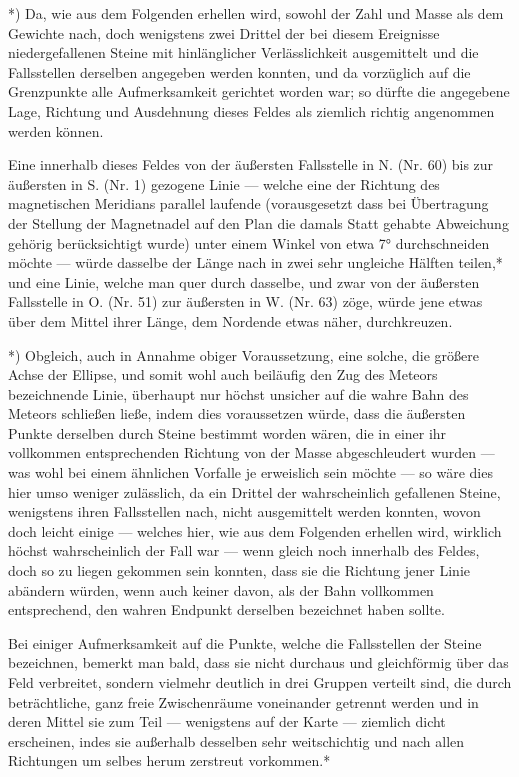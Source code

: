 \documentclass[a4paper, 11pt, oneside, german]{article}
\begin{document}
*) Da, wie aus dem Folgenden erhellen wird, sowohl der Zahl und Masse als dem Gewichte nach, doch wenigstens zwei Drittel der bei diesem Ereignisse niedergefallenen Steine mit hinlänglicher Verlässlichkeit ausgemittelt und die Fallsstellen derselben angegeben werden konnten, und da vorzüglich auf die Grenzpunkte alle Aufmerksamkeit gerichtet worden war; so dürfte die angegebene Lage, Richtung und Ausdehnung dieses Feldes als ziemlich richtig angenommen werden können.

Eine innerhalb dieses Feldes von der äußersten Fallsstelle in N. (Nr. 60) bis zur äußersten in S. (Nr. 1) gezogene Linie --- welche eine der Richtung des magnetischen Meridians parallel laufende (vorausgesetzt dass bei Übertragung der Stellung der Magnetnadel auf den Plan die damals Statt gehabte Abweichung gehörig berücksichtigt wurde) unter einem Winkel von etwa 7° durchschneiden möchte --- würde dasselbe der Länge nach in zwei sehr ungleiche Hälften teilen,* und eine Linie, welche man quer durch dasselbe, und zwar von der äußersten Fallsstelle in O. (Nr. 51) zur äußersten in W. (Nr. 63) zöge, würde jene etwas über dem Mittel ihrer Länge, dem Nordende etwas näher, durchkreuzen.

*) Obgleich, auch in Annahme obiger Voraussetzung, eine solche, die größere Achse der Ellipse, und somit wohl auch beiläufig den Zug des Meteors bezeichnende Linie, überhaupt nur höchst unsicher auf die wahre Bahn des Meteors schließen ließe, indem dies voraussetzen würde, dass die äußersten Punkte derselben durch Steine bestimmt worden wären, die in einer ihr vollkommen entsprechenden Richtung von der Masse abgeschleudert wurden --- was wohl bei einem ähnlichen Vorfalle je erweislich sein möchte --- so wäre dies hier umso weniger zulässlich, da ein Drittel der wahrscheinlich gefallenen Steine, wenigstens ihren Fallsstellen nach, nicht ausgemittelt werden konnten, wovon doch leicht einige --- welches hier, wie aus dem Folgenden erhellen wird, wirklich höchst wahrscheinlich der Fall war --- wenn gleich noch innerhalb des Feldes, doch so zu liegen gekommen sein konnten, dass sie die Richtung jener Linie abändern würden, wenn auch keiner davon, als der Bahn vollkommen entsprechend, den wahren Endpunkt derselben bezeichnet haben sollte.

Bei einiger Aufmerksamkeit auf die Punkte, welche die Fallsstellen der Steine bezeichnen, bemerkt man bald, dass sie nicht durchaus und gleichförmig über das Feld verbreitet, sondern vielmehr deutlich in drei Gruppen verteilt sind, die durch beträchtliche, ganz freie Zwischenräume voneinander getrennt werden und in deren Mittel sie zum Teil --- wenigstens auf der Karte --- ziemlich dicht erscheinen, indes sie außerhalb desselben sehr weitschichtig und nach allen Richtungen um selbes herum zerstreut vorkommen.*
\end{document}
